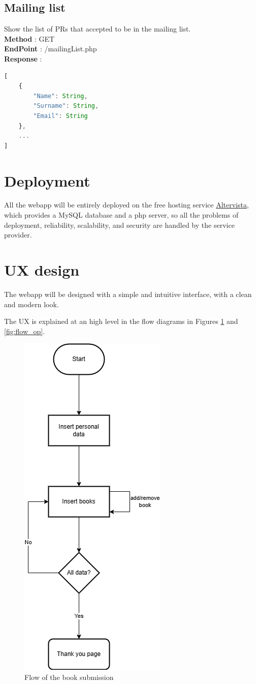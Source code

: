 \subsection{Mailing list}
Show the list of PRs that accepted to be in the mailing list.\\
\textbf{Method} : GET \\
\textbf{EndPoint} : /mailingList.php \\
\textbf{Response} :
\begin{lstlisting}[language=JavaScript, label={lst:jscode}, basicstyle=\ttfamily]
[
    {
        "Name": String,
        "Surname": String,
        "Email": String
    },
    ...
]
\end{lstlisting}


\section{Deployment}

All the webapp will be entirely deployed on the free hosting service \href{www.altervista.org}{Altervista}, which provides a MySQL database and a php server, so all the problems of deployment, reliability, scalability, and security are handled by the service provider.

\section{UX design}

The webapp will be designed with a simple and intuitive interface, with a clean and modern look.

The UX is explained at an high level in the flow diagrams in Figures \ref{fig:flow_book_submission} and \ref{fig:flow_op}.

\begin{figure}[ht]
    \centering
    \includegraphics[width=.25\textwidth]{assets/flow_book_submission.png}
    \caption{Flow of the book submission}
    \label{fig:flow_book_submission}
\end{figure}

